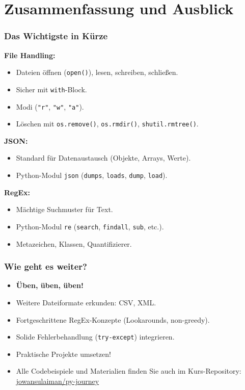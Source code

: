 \documentclass[aspectratio=169]{beamer} %
\begin{document}
\section{Zusammenfassung und Ausblick}
\begin{frame}[fragile]
\frametitle{Das Wichtigste in Kürze}
\textbf{File Handling:}
\begin{itemize}
    \item Dateien öffnen (\texttt{open()}), lesen, schreiben, schließen.
    \item Sicher mit \texttt{with}-Block.
    \item Modi (\texttt{"r"}, \texttt{"w"}, \texttt{"a"}).
    \item Löschen mit \texttt{os.remove()}, \texttt{os.rmdir()}, \texttt{shutil.rmtree()}.
\end{itemize}
\textbf{JSON:}
\begin{itemize}
    \item Standard für Datenaustausch (Objekte, Arrays, Werte).
    \item Python-Modul \texttt{json} (\texttt{dumps}, \texttt{loads}, \texttt{dump}, \texttt{load}).
\end{itemize}
\textbf{RegEx:}
\begin{itemize}
    \item Mächtige Suchmuster für Text.
    \item Python-Modul \texttt{re} (\texttt{search}, \texttt{findall}, \texttt{sub}, etc.).
    \item Metazeichen, Klassen, Quantifizierer.
\end{itemize}
\end{frame}

\begin{frame}[fragile]
\frametitle{Wie geht es weiter?}
\begin{itemize}
    \item \textbf{Üben, üben, üben!}
    \item Weitere Dateiformate erkunden: CSV, XML.
    \item Fortgeschrittene RegEx-Konzepte (Lookarounds, non-greedy).
    \item Solide Fehlerbehandlung (\texttt{try-except}) integrieren.
    \item Praktische Projekte umsetzen!
    \item Alle Codebeispiele und Materialien finden Sie auch im Kurs-Repository: \href{https://github.com/jowansulaiman/py-journey}{jowansulaiman/py-journey}
\end{itemize}
\end{frame}
\end{document}
